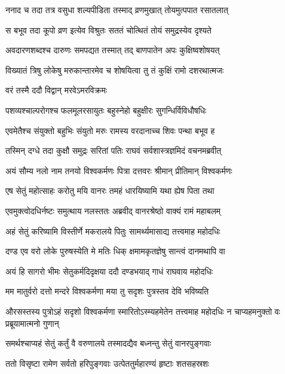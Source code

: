 \twolineshloka
{ननाद च तदा तत्र वसुधा शल्यपीडिता}
{तस्माद् व्रणमुखात् तोयमुत्पपात रसातलात्} %

\twolineshloka
{स बभूव तदा कूपो व्रण इत्येव विश्रुतः}
{सततं चोत्थितं तोयं समुद्रस्येव दृश्यते} %

\twolineshloka
{अवदारणशब्दश्च दारुणः समपद्यत}
{तस्मात् तद् बाणपातेन अपः कुक्षिष्वशोषयत्} %

\twolineshloka
{विख्यातं त्रिषु लोकेषु मरुकान्तारमेव च}
{शोषयित्वा तु तं कुक्षिं रामो दशरथात्मजः} %

\onelineshloka
{वरं तस्मै ददौ विद्वान् मरवेऽमरविक्रमः} %

\twolineshloka
{पशव्यश्चाल्परोगश्च फलमूलरसायुतः}
{बहुस्नेहो बहुक्षीरः सुगन्धिर्विविधौषधिः} %

\twolineshloka
{एवमेतैश्च संयुक्तो बहुभिः संयुतो मरुः}
{रामस्य वरदानाच्च शिवः पन्था बभूव ह} %

\twolineshloka
{तस्मिन् दग्धे तदा कुक्षौ समुद्रः सरितां पतिः}
{राघवं सर्वशास्त्रज्ञमिदं वचनमब्रवीत्} %

\twolineshloka
{अयं सौम्य नलो नाम तनयो विश्वकर्मणः}
{पित्रा दत्तवरः श्रीमान् प्रीतिमान् विश्वकर्मणः} %

\twolineshloka
{एष सेतुं महोत्साहः करोतु मयि वानरः}
{तमहं धारयिष्यामि यथा ह्येष पिता तथा} %

\twolineshloka
{एवमुक्त्वोदधिर्नष्टः समुत्थाय नलस्ततः}
{अब्रवीद् वानरश्रेष्ठो वाक्यं रामं महाबलम्} %

\twolineshloka
{अहं सेतुं करिष्यामि विस्तीर्णे मकरालये}
{पितुः सामर्थ्यमासाद्य तत्त्वमाह महोदधिः} %

\twolineshloka
{दण्ड एव वरो लोके पुरुषस्येति मे मतिः}
{धिक् क्षमामकृतज्ञेषु सान्त्वं दानमथापि वा} %

\twolineshloka
{अयं हि सागरो भीमः सेतुकर्मदिदृक्षया}
{ददौ दण्डभयाद् गाधं राघवाय महोदधिः} %

\twolineshloka
{मम मातुर्वरो दत्तो मन्दरे विश्वकर्मणा}
{मया तु सदृशः पुत्रस्तव देवि भविष्यति} %

\threelineshloka
{औरसस्तस्य पुत्रोऽहं सदृशो विश्वकर्मणा}
{स्मारितोऽस्म्यहमेतेन तत्त्वमाह महोदधिः}
{न चाप्यहमनुक्तो वः प्रब्रूयामात्मनो गुणान्} %

\twolineshloka
{समर्थश्चाप्यहं सेतुं कर्तुं वै वरुणालये}
{तस्मादद्यैव बध्नन्तु सेतुं वानरपुङ्गवाः} %

\twolineshloka
{ततो विसृष्टा रामेण सर्वतो हरिपुङ्गवाः}
{उत्पेततुर्महारण्यं हृष्टाः शतसहस्रशः} %

